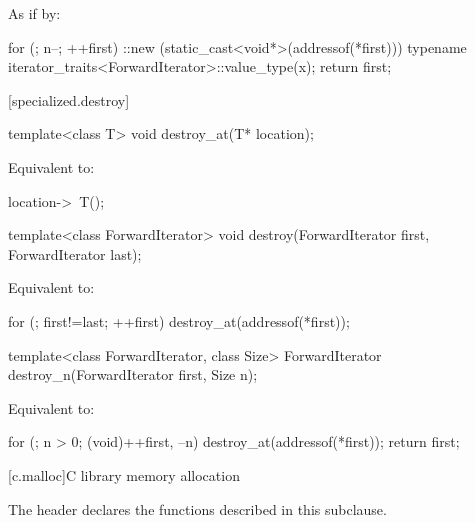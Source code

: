 \begin{itemdescr}
\pnum
\effects
As if by:
\begin{codeblock}
for (; n--; ++first)
  ::new (static_cast<void*>(addressof(*first)))
    typename iterator_traits<ForwardIterator>::value_type(x);
return first;
\end{codeblock}
\end{itemdescr}

[specialized.destroy]{}

%
\begin{itemdecl}
template<class T>
  void destroy_at(T* location);
\end{itemdecl}

\begin{itemdescr}
\pnum
\effects
Equivalent to:
\begin{codeblock}
location->~T();
\end{codeblock}
\end{itemdescr}

%
\begin{itemdecl}
template<class ForwardIterator>
  void destroy(ForwardIterator first, ForwardIterator last);
\end{itemdecl}

\begin{itemdescr}
\pnum
\effects
Equivalent to:
\begin{codeblock}
for (; first!=last; ++first)
  destroy_at(addressof(*first));
\end{codeblock}
\end{itemdescr}

%
\begin{itemdecl}
template<class ForwardIterator, class Size>
  ForwardIterator destroy_n(ForwardIterator first, Size n);
\end{itemdecl}

\begin{itemdescr}
\pnum
\effects
Equivalent to:
\begin{codeblock}
for (; n > 0; (void)++first, --n)
  destroy_at(addressof(*first));
return first;
\end{codeblock}
\end{itemdescr}

[c.malloc]{C library memory allocation}

\pnum
{}%
\begin{note}
The header 
declares the functions described in this subclause.
\end{note}

